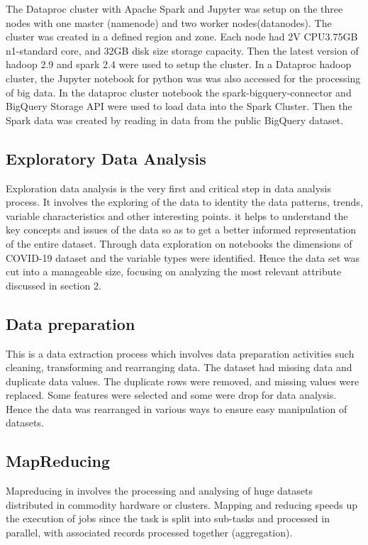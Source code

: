 \documentclass[12pt]{article}
\begin{document}
The Dataproc cluster with Apache Spark  and Jupyter was setup on the three nodes with one master (namenode) and two worker nodes(datanodes). The cluster was created in a defined region and zone. Each node had 2V CPU3.75GB n1-standard core, and 32GB disk size storage capacity. Then the latest version of hadoop 2.9 and spark 2.4 were used to setup the cluster. In a Dataproc hadoop cluster, the Jupyter notebook for python was was also accessed for the processing of big data.  In the dataproc cluster notebook the spark-bigquery-connector and BigQuery Storage API were used to  load data into the Spark Cluster. Then the Spark data was created by reading in data from the public BigQuery dataset. 

\subsection{ Exploratory Data Analysis}
Exploration data analysis is the very first and critical step in data analysis process. It involves the exploring of the data to identity the data patterns, trends, variable characteristics and other interesting points. it helps to understand the key concepts and issues of the data so as to get a better informed representation of the entire dataset. Through data exploration on notebooks the dimensions of COVID-19 dataset and the variable types were identified. Hence the data set was cut into a manageable size, focusing on analyzing the most relevant attribute discussed in section 2. 

\subsection{Data preparation}
 This is a data extraction process which involves data preparation activities such cleaning, transforming and rearranging  data. The dataset had missing data and duplicate data values. The duplicate rows were removed, and missing values were replaced. Some features were selected and some were drop for data analysis. Hence the data was rearranged in various ways to ensure easy manipulation of datasets. 


\subsection{MapReducing}
Mapreducing  in involves the processing and analysing of  huge datasets distributed in commodity hardware  or clusters.  Mapping and reducing speeds up the execution of jobs since the task is split into sub-tasks and processed in parallel, with associated records processed together (aggregation).
\end{document}
